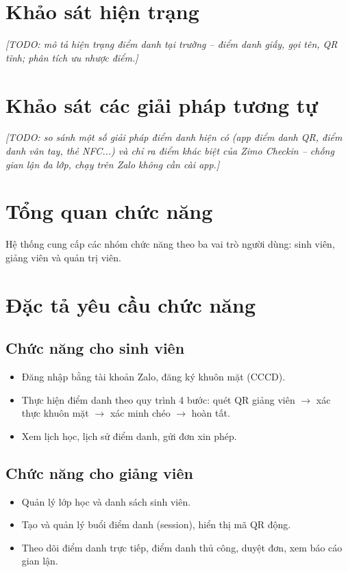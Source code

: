 \documentclass[../main.tex]{subfiles}
\begin{document}
\section{Khảo sát hiện trạng}
\textit{[TODO: mô tả hiện trạng điểm danh tại trường -- điểm danh giấy, gọi tên, QR tĩnh; phân tích ưu nhược điểm.]}

\section{Khảo sát các giải pháp tương tự}
\textit{[TODO: so sánh một số giải pháp điểm danh hiện có (app điểm danh QR, điểm danh vân tay, thẻ NFC...) và chỉ ra điểm khác biệt của Zimo Checkin -- chống gian lận đa lớp, chạy trên Zalo không cần cài app.]}

\section{Tổng quan chức năng}
Hệ thống cung cấp các nhóm chức năng theo ba vai trò người dùng: sinh viên, giảng viên và quản trị viên.

\section{Đặc tả yêu cầu chức năng}
\subsection{Chức năng cho sinh viên}
\begin{itemize}
    \item Đăng nhập bằng tài khoản Zalo, đăng ký khuôn mặt (CCCD).
    \item Thực hiện điểm danh theo quy trình 4 bước: quét QR giảng viên $\rightarrow$ xác thực khuôn mặt $\rightarrow$ xác minh chéo $\rightarrow$ hoàn tất.
    \item Xem lịch học, lịch sử điểm danh, gửi đơn xin phép.
\end{itemize}

\subsection{Chức năng cho giảng viên}
\begin{itemize}
    \item Quản lý lớp học và danh sách sinh viên.
    \item Tạo và quản lý buổi điểm danh (session), hiển thị mã QR động.
    \item Theo dõi điểm danh trực tiếp, điểm danh thủ công, duyệt đơn, xem báo cáo gian lận.
\end{itemize}
\end{document}

